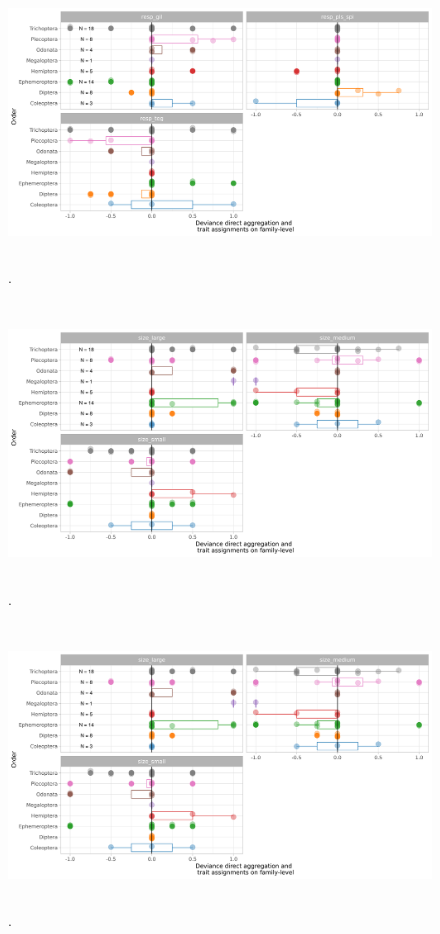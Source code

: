 \documentclass{article}
\begin{document}
\begin{figure}[H]
  \centering
  \caption{.}
  \label{fig:trait_dev_dir_agg_resp}
  \includegraphics[width=14cm, height=7.5cm]{trait_deviations_dir_famlvl_resp.png}
\end{figure}

\begin{figure}[H]
  \centering
  \caption{.}
  \label{fig:trait_dev_dir_agg_size}
  \includegraphics[width=14cm, height=7.5cm]{trait_deviations_dir_famlvl_size.png}
\end{figure}

\begin{figure}[H]
  \centering
  \caption{.}
  \label{fig:trait_dev_dir_agg_volt}
  \includegraphics[width=14cm, height=7.5cm]{trait_deviations_dir_famlvl_size.png}
\end{figure}
\end{document}
